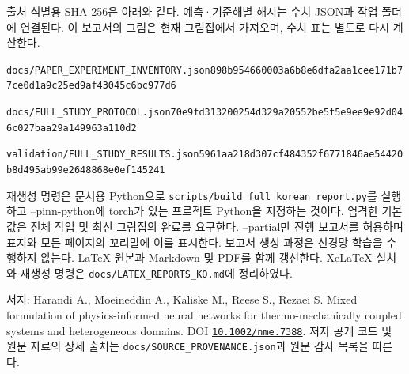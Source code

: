 \documentclass[10pt,a4paper]{article}
\begin{document}
{\small\color{muted} 출처 식별용 SHA-256은 아래와 같다. 예측·기준해별 해시는 수치 JSON과 작업 폴더에 연결된다. 이 보고서의 그림은 현재 그림집에서 가져오며, 수치 표는 별도로 다시 계산한다.\par}

{\small\color{muted} \nolinkurl{docs/PAPER_EXPERIMENT_INVENTORY.json}\newline \nolinkurl{898b954660003a6b8e6dfa2aa1cee171b77ce0d1a9c25ed9af43045c6bc977d6}\par}

{\small\color{muted} \nolinkurl{docs/FULL_STUDY_PROTOCOL.json}\newline \nolinkurl{70e9fd313200254d329a20552be5f5e9ee9e92d046c027baa29a149963a110d2}\par}

{\small\color{muted} \nolinkurl{validation/FULL_STUDY_RESULTS.json}\newline \nolinkurl{5961aa218d307cf484352f6771846ae54420b8d495ab99e2648868e0ef145241}\par}

재생성 명령은 문서용 Python으로 \nolinkurl{scripts/build_full_korean_report.py}를 실행하고 --pinn-python에 torch가 있는 프로젝트 Python을 지정하는 것이다. 엄격한 기본값은 전체 작업 및 최신 그림집의 완료를 요구한다. --partial만 진행 보고서를 허용하며 표지와 모든 페이지의 꼬리말에 이를 표시한다. 보고서 생성 과정은 신경망 학습을 수행하지 않는다. LaTeX 원본과 Markdown 및 PDF를 함께 갱신한다. XeLaTeX 설치와 재생성 명령은 \nolinkurl{docs/LATEX_REPORTS_KO.md}에 정리하였다.\par

{\small\color{muted} 서지: Harandi A., Moeineddin A., Kaliske M., Reese S., Rezaei S. Mixed formulation of physics-informed neural networks for thermo-mechanically coupled systems and heterogeneous domains. DOI \href{https://doi.org/10.1002/nme.7388}{\nolinkurl{10.1002/nme.7388}}. 저자 공개 코드 및 원문 자료의 상세 출처는 \nolinkurl{docs/SOURCE_PROVENANCE.json}과 원문 감사 목록을 따른다.\par}
\end{document}
